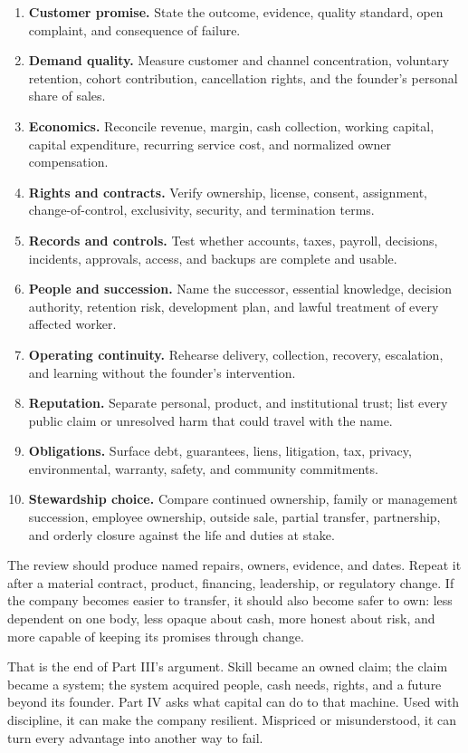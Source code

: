 \begin{enumerate}[itemsep=0.14em]
\item \textbf{Customer promise.} State the outcome, evidence, quality standard,
  open complaint, and consequence of failure.
\item \textbf{Demand quality.} Measure customer and channel concentration,
  voluntary retention, cohort contribution, cancellation rights, and the
  founder's personal share of sales.
\item \textbf{Economics.} Reconcile revenue, margin, cash collection, working
  capital, capital expenditure, recurring service cost, and normalized owner
  compensation.
\item \textbf{Rights and contracts.} Verify ownership, license, consent,
  assignment, change-of-control, exclusivity, security, and termination terms.
\item \textbf{Records and controls.} Test whether accounts, taxes, payroll,
  decisions, incidents, approvals, access, and backups are complete and usable.
\item \textbf{People and succession.} Name the successor, essential knowledge,
  decision authority, retention risk, development plan, and lawful treatment
  of every affected worker.
\item \textbf{Operating continuity.} Rehearse delivery, collection, recovery,
  escalation, and learning without the founder's intervention.
\item \textbf{Reputation.} Separate personal, product, and institutional trust;
  list every public claim or unresolved harm that could travel with the name.
\item \textbf{Obligations.} Surface debt, guarantees, liens, litigation, tax,
  privacy, environmental, warranty, safety, and community commitments.
\item \textbf{Stewardship choice.} Compare continued ownership, family or
  management succession, employee ownership, outside sale, partial transfer,
  partnership, and orderly closure against the life and duties at stake.
\end{enumerate}

The review should produce named repairs, owners, evidence, and dates. Repeat it
after a material contract, product, financing, leadership, or regulatory change.
If the company becomes easier to transfer, it should also become safer to own:
less dependent on one body, less opaque about cash, more honest about risk, and
more capable of keeping its promises through change.

That is the end of Part III's argument. Skill became an owned claim; the claim
became a system; the system acquired people, cash needs, rights, and a future
beyond its founder. Part IV asks what capital can do to that machine. Used with
discipline, it can make the company resilient. Mispriced or misunderstood, it
can turn every advantage into another way to fail.
